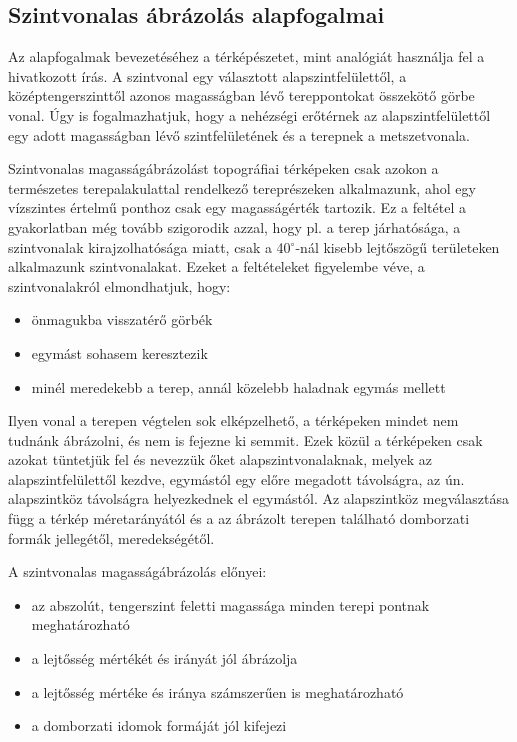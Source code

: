 \documentclass[12pt]{article}
\theoremstyle{plain}
\begin{document}
\subsection{Szintvonalas ábrázolás alapfogalmai}
Az alapfogalmak bevezetéséhez a térképészetet, mint analógiát használja fel a hivatkozott írás. 
A szintvonal egy választott alapszintfelülettől, a középtengerszinttől azonos magasságban lévő tereppontokat összekötő görbe vonal. Úgy is fogalmazhatjuk, hogy a nehézségi erőtérnek az alapszintfelülettől egy adott magasságban lévő szintfelületének és a terepnek a metszetvonala.

Szintvonalas magasságábrázolást topográfiai térképeken csak azokon a természetes terepalakulattal rendelkező tereprészeken alkalmazunk, ahol egy vízszintes értelmű ponthoz csak egy magasságérték tartozik. Ez a feltétel a gyakorlatban még tovább szigorodik azzal, hogy pl. a terep járhatósága, a szintvonalak kirajzolhatósága miatt, csak a 40$^{\circ}$-nál kisebb lejtőszögű területeken alkalmazunk szintvonalakat. Ezeket a feltételeket figyelembe véve, a szintvonalakról elmondhatjuk, hogy:

\begin{itemize}
   \item önmagukba visszatérő görbék
   \item egymást sohasem keresztezik
   \item minél meredekebb a terep, annál közelebb haladnak egymás mellett
   
\end{itemize}


Ilyen vonal a terepen végtelen sok elképzelhető, a térképeken mindet nem tudnánk ábrázolni, és nem is fejezne ki semmit. Ezek közül a térképeken csak azokat tüntetjük fel és nevezzük őket alapszintvonalaknak, melyek az alapszintfelülettől kezdve, egymástól egy előre megadott távolságra, az ún. alapszintköz távolságra helyezkednek el egymástól. Az alapszintköz megválasztása függ a térkép méretarányától és a az ábrázolt terepen található domborzati formák jellegétől, meredekségétől.

A szintvonalas magasságábrázolás előnyei:

\begin{itemize}
   \item az abszolút, tengerszint feletti magassága minden terepi pontnak meghatározható
   \item a lejtősség mértékét és irányát jól ábrázolja
   \item a lejtősség mértéke és iránya számszerűen is meghatározható
   \item a domborzati idomok formáját jól kifejezi
\end{itemize}
\end{document}
